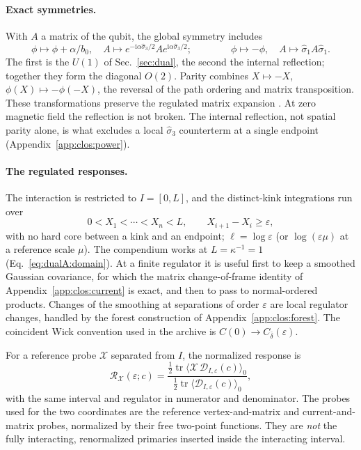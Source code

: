 \documentclass[11pt,a4paper]{article}
\numberwithin{equation}{section}
\newcommand{\db}{\bar\delta}
\begin{document}
\paragraph{Exact symmetries.} With $A$ a matrix of the qubit, the global symmetry includes
\begin{equation}
 \phi\mapsto\phi+\alpha/b_0,\quad A\mapsto e^{-\mathrm i\alpha\hat\sigma_3/2}Ae^{\mathrm i\alpha\hat\sigma_3/2};
 \qquad\qquad
 \phi\mapsto-\phi,\quad A\mapsto\hat\sigma_1A\hat\sigma_1.
 \label{eq:clos:symmetry}
\end{equation}
The first is the $U(1)$ of Sec.~\ref{sec:dual}, the second the internal reflection; together they form the diagonal
$O(2)$. Parity combines $X\mapsto-X$, $\phi(X)\mapsto-\phi(-X)$, the reversal of the path ordering and matrix
transposition. These transformations preserve the regulated matrix expansion
\cite[Eqs.~(3.31)--(3.35)]{Benedetti:2025nzp}. At zero magnetic field the reflection is not broken. The internal
reflection, not spatial parity alone, is what excludes a local $\hat\sigma_3$ counterterm at a single endpoint
(Appendix~\ref{app:clos:power}).

\paragraph{The regulated responses.} The interaction is restricted to $I=[0,L]$, and the distinct-kink integrations
run over
\begin{equation}
 0<X_1<\cdots<X_n<L,\qquad X_{i+1}-X_i\ge\varepsilon,
 \label{eq:clos:cutoff}
\end{equation}
with no hard core between a kink and an endpoint; $\ell=\log\varepsilon$ (or $\log(\varepsilon\mu)$ at a reference
scale $\mu$). The compendium works at $L=\kappa^{-1}=1$ (Eq.~\eqref{eq:dualA:domain}). At a finite regulator it
is useful first to keep a smoothed Gaussian covariance, for which the matrix change-of-frame identity of
Appendix~\ref{app:clos:current} is exact, and then to pass to normal-ordered products. Changes of the smoothing at
separations of order $\varepsilon$ are local regulator changes, handled by the forest construction of
Appendix~\ref{app:clos:forest}. The coincident Wick convention used in the archive is $C(0)\to C_{\db}(\varepsilon)$.

For a reference probe $\mathcal X$ separated from $I$, the normalized response is
\begin{equation}
 \mathcal R_{\mathcal X}(\varepsilon;c)
 =\frac{\frac12\operatorname{tr}\langle\mathcal X\,\mathcal D_{I,\varepsilon}(c)\rangle_0}
 {\frac12\operatorname{tr}\langle\mathcal D_{I,\varepsilon}(c)\rangle_0},
 \label{eq:clos:ratio}
\end{equation}
with the same interval and regulator in numerator and denominator. The probes used for the two coordinates are the
reference vertex-and-matrix and current-and-matrix probes, normalized by their free two-point functions. They are
\emph{not} the fully interacting, renormalized primaries inserted inside the interacting interval.
\end{document}
